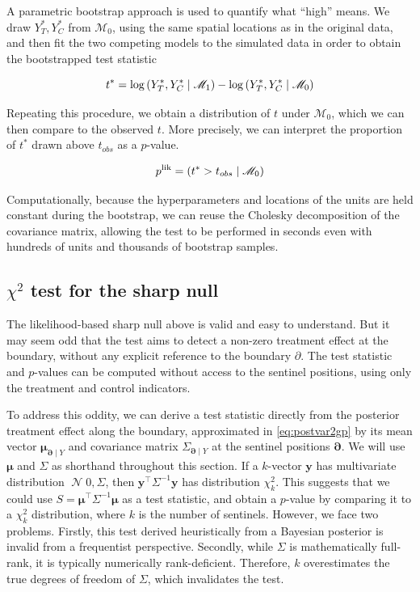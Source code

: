 \documentclass[letter]{article}
\newcommand{\genericdel}[3]{%
      \left#1#3\right#2
    }
\newcommand{\del}[1]{\genericdel(){#1}}
\let\Pr\relax
\DeclareMathOperator{\Pr}{\mathbb{P}}
\DeclareMathOperator{\normal}{\mathcal{N}}
\newcommand{\trans}{^{\intercal}}
\newcommand{\yvec}{\mathbold{y}}
\newcommand{\muvec}{\mathbold{\mu}}
\newcommand{\boundary}{\partial}
\newcommand{\sentinels}{\bm{\boundary}}
\newcommand{\modnull}{\mathscr{M}_0}
\newcommand{\modalt}{\mathscr{M}_1}
\begin{document}
A parametric bootstrap approach is used to quantify what ``high'' means. We draw \(Y_T^*,Y_C^*\) from \(\modnull\),
using the same spatial locations as in the original data,
and then fit the two competing models to the simulated data in order to obtain the bootstrapped test statistic

\begin{equation}
    t^* = \log \Pr\del{Y_T^*, Y_C^* \mid \modalt} - \log \Pr\del{Y_T^*, Y_C^* \mid \modnull}
\end{equation}

Repeating this procedure, we obtain a distribution of \(t\) under \(\modnull\),
which we can then compare to the observed \(t\).
More precisely, we can interpret the proportion of \(t^*\) drawn above \(t_{obs}\) as a \(p\)-value.

\begin{equation}
    p^{\mathrm{lik}} = \Pr\del{t^* > t_{obs} \mid \modnull}
\end{equation}

Computationally, because the hyperparameters and locations of the units are held constant during the bootstrap, we can reuse the Cholesky decomposition of the covariance matrix, allowing the test to be performed in seconds even with hundreds of units and thousands of bootstrap samples.
    


    	\subsection{\texorpdfstring{\(\chi^2\) test for the sharp null}{\textbackslash{}chi\^{}2 test for the sharp null}}\label{chi2-test-for-the-sharp-null}

The likelihood-based sharp null above is valid and easy to understand.
But it may seem odd that the test aims to detect a non-zero treatment effect at the boundary, without any explicit reference to the boundary \(\boundary\). The test statistic and \(p\)-values can be computed without access to the sentinel positions, using only the treatment and control indicators.

To address this oddity, we can derive a test statistic directly from the posterior treatment effect along the boundary,
approximated in \eqref{eq:postvar2gp} by its mean vector \(\muvec_{\sentinels \mid Y}\)
and covariance matrix \(\Sigma_{\sentinels \mid Y}\) at the sentinel positions \(\sentinels\).
We will use \(\muvec\) and \(\Sigma\) as shorthand throughout this section.
If a \(k\)-vector \(\yvec\) has multivariate distribution \(\normal{0, \Sigma}\), then \(\yvec\trans \Sigma^{-1} \yvec\) has distribution \(\chi^2_k\).
This suggests that we could use \(S=\muvec\trans \Sigma^{-1} \muvec\) as a test statistic,
and obtain a \(p\)-value by comparing it to a \(\chi^2_k\) distribution, where \(k\) is the number of sentinels.
However, we face two problems.
Firstly, this test derived heuristically from a Bayesian posterior is invalid from a frequentist perspective.
Secondly, while \(\Sigma\) is mathematically full-rank, it is typically numerically rank-deficient.
Therefore, \(k\) overestimates the true degrees of freedom of \(\Sigma\), which invalidates the test.
\end{document}

